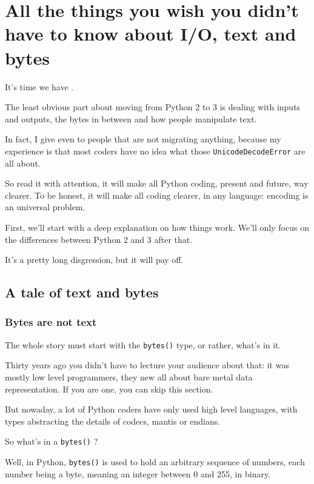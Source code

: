 \chapter{All the things you wish you didn't have to know about I/O, text and bytes}\label{chap:text_and_bytes}

It's time we have .

The least obvious part about moving from Python 2 to 3 is dealing with inputs and outputs, the bytes in between and how people manipulate text.

In fact, I give  even to people that are not migrating anything, because my experience is that most coders have no idea what those \lstinline{UnicodeDecodeError} are all about.

So read it with attention, it will make all Python coding, present and future, way clearer. To be honest, it will make all coding clearer, in any language: encoding is an universal problem.

First, we'll start with a deep explanation on how things work. We'll only focus on the differences between Python 2 and 3 after that.

It's a pretty long disgression, but it will pay off.

\section{A tale of text and bytes}

\subsection{Bytes are not text}

The whole story must start with the \lstinline{bytes()} type, or rather, what's in it.

Thirty years ago you didn't have to lecture your audience about that: it was mostly low level programmers, they new all about bare metal data representation. If you are one, you can skip this section.

But nowaday, a lot of Python coders have only used high level languages, with types abstracting the details of codecs, mantis or endians.

So what's in a \lstinline{bytes()} ?

Well, in Python, \lstinline{bytes()} is used to hold an arbitrary sequence of numbers, each number being a byte, meaning an integer between 0 and 255, in binary.

